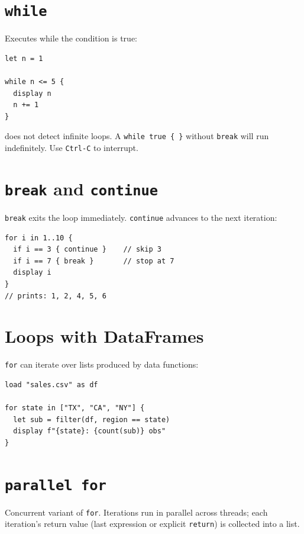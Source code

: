 \section{\texttt{while}}

Executes while the condition is true:

\begin{lstlisting}[caption={Basic while}]
let n = 1

while n <= 5 {
  display n
  n += 1
}
\end{lstlisting}

\begin{aviso}
  \hayashi{} does not detect infinite loops. A \lstinline|while true { }|
  without \lstinline{break} will run indefinitely. Use \texttt{Ctrl-C}
  to interrupt.
\end{aviso}

\section{\texttt{break} and \texttt{continue}}

\lstinline{break} exits the loop immediately. \lstinline{continue} advances
to the next iteration:

\begin{lstlisting}[caption={break and continue}]
for i in 1..10 {
  if i == 3 { continue }    // skip 3
  if i == 7 { break }       // stop at 7
  display i
}
// prints: 1, 2, 4, 5, 6
\end{lstlisting}

\section{Loops with DataFrames}

\lstinline{for} can iterate over lists produced by data functions:

\begin{lstlisting}[caption={Iterating over groups}]
load "sales.csv" as df

for state in ["TX", "CA", "NY"] {
  let sub = filter(df, region == state)
  display f"{state}: {count(sub)} obs"
}
\end{lstlisting}

\section{\texttt{parallel for}}

Concurrent variant of \texttt{for}. Iterations run in parallel across
threads; each iteration's return value (last expression or explicit
\texttt{return}) is collected into a list.

